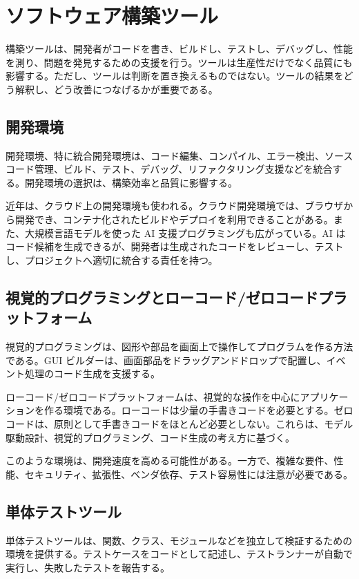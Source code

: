 \documentclass[a4paper,11pt,ja=standard,xelatex]{bxjsarticle}
\begin{document}
\section{ソフトウェア構築ツール}

構築ツールは、開発者がコードを書き、ビルドし、テストし、デバッグし、性能を測り、問題を発見するための支援を行う。ツールは生産性だけでなく品質にも影響する。ただし、ツールは判断を置き換えるものではない。ツールの結果をどう解釈し、どう改善につなげるかが重要である。

\subsection{開発環境}

開発環境、特に統合開発環境は、コード編集、コンパイル、エラー検出、ソースコード管理、ビルド、テスト、デバッグ、リファクタリング支援などを統合する。開発環境の選択は、構築効率と品質に影響する。

近年は、クラウド上の開発環境も使われる。クラウド開発環境では、ブラウザから開発でき、コンテナ化されたビルドやデプロイを利用できることがある。また、大規模言語モデルを使った AI 支援プログラミングも広がっている。AI はコード候補を生成できるが、開発者は生成されたコードをレビューし、テストし、プロジェクトへ適切に統合する責任を持つ。

\subsection{視覚的プログラミングとローコード/ゼロコードプラットフォーム}

視覚的プログラミングは、図形や部品を画面上で操作してプログラムを作る方法である。GUI ビルダーは、画面部品をドラッグアンドドロップで配置し、イベント処理のコード生成を支援する。

ローコード/ゼロコードプラットフォームは、視覚的な操作を中心にアプリケーションを作る環境である。ローコードは少量の手書きコードを必要とする。ゼロコードは、原則として手書きコードをほとんど必要としない。これらは、モデル駆動設計、視覚的プログラミング、コード生成の考え方に基づく。

このような環境は、開発速度を高める可能性がある。一方で、複雑な要件、性能、セキュリティ、拡張性、ベンダ依存、テスト容易性には注意が必要である。

\subsection{単体テストツール}

単体テストツールは、関数、クラス、モジュールなどを独立して検証するための環境を提供する。テストケースをコードとして記述し、テストランナーが自動で実行し、失敗したテストを報告する。
\end{document}
